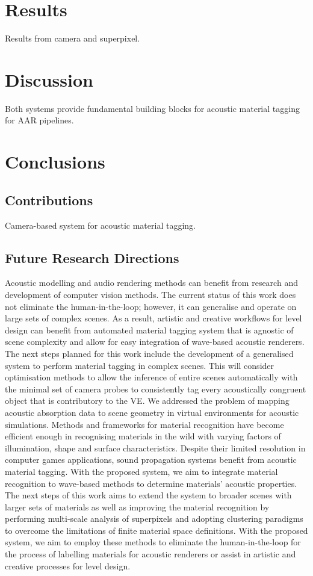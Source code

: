 \section{Results}
Results from camera and superpixel.


\section{Discussion}
Both systems provide fundamental building blocks for acoustic material tagging for AAR pipelines.

\section{Conclusions}

\subsection{Contributions}
Camera-based system for acoustic material tagging.

\subsection{Future Research Directions}
Acoustic modelling and audio rendering methods can benefit from research and development of computer vision methods. 
The current status of this work does not eliminate the human-in-the-loop; however, it can generalise and operate on large sets of complex scenes. As a result, artistic and creative workflows for level design can benefit from automated material tagging system that is agnostic of scene complexity and allow for easy integration of wave-based acoustic renderers.
The next steps planned for this work include the development of a generalised system to perform material tagging in complex scenes. This will consider optimisation methods to allow the inference of entire scenes automatically with the minimal set of camera probes to consistently tag every acoustically congruent object that is contributory to the VE. 
We addressed the problem of mapping acoustic absorption data to scene geometry in virtual environments for acoustic simulations. Methods and frameworks for material recognition have become efficient enough in recognising materials in the wild with varying factors of illumination, shape and surface characteristics. Despite their limited resolution in computer games applications, sound propagation systems benefit from acoustic material tagging. With the proposed system, we aim to integrate material recognition to wave-based methods to determine materials' acoustic properties.
The next steps of this work aims to extend the system to broader scenes with larger sets of materials as well as improving the material recognition by performing multi-scale analysis of superpixels and adopting clustering paradigms to overcome the limitations of finite material space definitions.
With the proposed system, we aim to employ these methods to eliminate the human-in-the-loop for the process of labelling materials for acoustic renderers or assist in artistic and creative processes for level design. 

